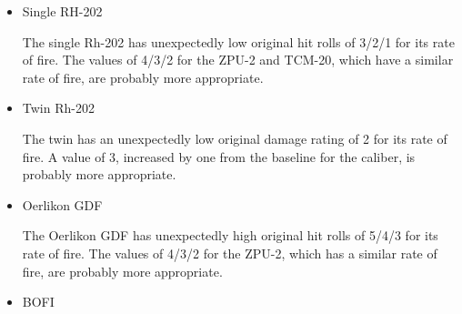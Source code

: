 \documentclass[10pt]{article}
\begin{document}
{\begin{itemize}
            Furthermore, all of these except for the ZU-23 (both \emph{Air Strike} and \emph{The Speed of Heat} versions) have damage ratings increased by one above their baseline values.

            It seems that either there is some reason to reduce the effectiveness of the ZPU-4 and ZU-23 compared to these other guns, or perhaps they have inconsistent values rolls.

            The ZU-23 is undeniably basic, and one might think that would be reason to reduce its effectiveness. However, the TCM-20 is basic too and has both a lower rate of fire than the ZU-23 (1450 compared to 2000) and a smaller caliber (20~mm compared to 23~mm), yet its hit rolls are higher than the ZU-23 in \emph{The Speed of Heat} and its damage rating is the same.

            The best solution would seem to be to give these guns the values we would expect from comparing them to other guns with similar rate of fire and calibre. Therefore, I give both the ZPU-4 and ZU-23 hit rolls of 5/4/3 and the ZU-23 a damage rating of 3.

            (I also considered the idea that increasing the rate of fire increases \emph{either} the hit rolls \emph{or} the damage rating. However, while this might explain the ZPU-4 from \emph{The Speed of Heat} and the twin Rh-202, it does not correctly predict the values of the M167 or Gemag.)

        \item Single RH-202

            The single Rh-202 has unexpectedly low original hit rolls of 3/2/1 for its rate of fire. The values of 4/3/2 for the ZPU-2 and TCM-20, which have a similar rate of fire, are probably more appropriate.

        \item Twin Rh-202

            The twin has an unexpectedly low original damage rating of 2 for its rate of fire. A value of 3, increased by one from the baseline for the caliber, is probably more appropriate.

        \item Oerlikon GDF

            The Oerlikon GDF has unexpectedly high original hit rolls of 5/4/3 for its rate of fire. The values of 4/3/2 for the ZPU-2, which has a similar rate of fire, are probably more appropriate.

        \item BOFI


\end{itemize}}
\end{document}
